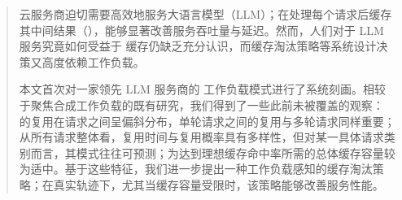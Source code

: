 \begin{abstract}
云服务商迫切需要高效地服务大语言模型（LLM）；在处理每个请求后缓存其中间结果（{\kvcache}），能够显著改善服务吞吐量与延迟。然而，人们对于 LLM 服务究竟如何受益于 {\kvcache} 缓存仍缺乏充分认识，而缓存淘汰策略等系统设计决策又高度依赖工作负载。

本文首次对一家领先 LLM 服务商的 {\kvcache} 工作负载模式进行了系统刻画。相较于聚焦合成工作负载的既有研究，我们得到了一些此前未被覆盖的观察：{\kvcache} 的复用在请求之间呈偏斜分布，单轮请求之间的复用与多轮请求同样重要；从所有请求整体看，复用时间与复用概率具有多样性，但对某一具体请求类别而言，其模式往往可预测；为达到理想缓存命中率所需的总体缓存容量较为适中。基于这些特征，我们进一步提出一种工作负载感知的缓存淘汰策略；在真实轨迹下，尤其当缓存容量受限时，该策略能够改善服务性能。
\end{abstract}

